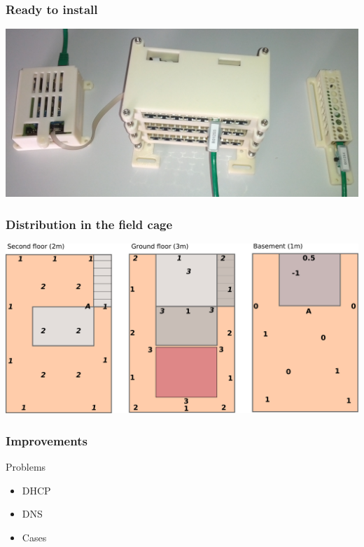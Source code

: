 \documentclass[t]{beamer}
\begin{document}
\begin{frame}[c]
    \frametitle{Ready to install}
  \begin{center}
  	\includegraphics[width=0.9\linewidth]{img/set.jpg}\\
  \vspace{0.5cm}
  \end{center}
\end{frame}
\begin{frame}[c]
    \frametitle{Distribution in the field cage}
  \begin{center}
  	\includegraphics[width=0.9\linewidth]{img/installPlan.pdf}\\
  \vspace{0.5cm}
  \end{center}
\end{frame}
\begin{frame}[c]
    \frametitle{Improvements}
		\begin{alertblock}{Problems}
			\textcolor{blue!30!green}{
				\begin{itemize}
					\item DHCP
					\item DNS
					\item Cases
				\end{itemize}
			}
		\end{alertblock}
\end{frame}
\end{document}
